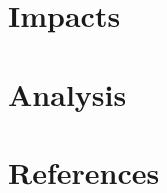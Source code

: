\documentclass[twocolumn]{article}
\begin{document}
\section*{Impacts}

\section*{Analysis}

\section*{References}

\printbibliography
\end{document}
